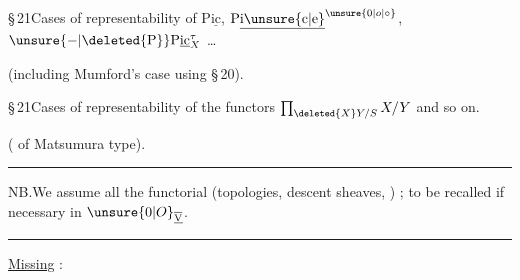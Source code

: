 \S\,21\quad Cases of representability of $\mathrm P\underline{\mathrm{ic}}$, $\mathrm P\underline{\mathrm i\unsure{\mathrm c|\mathrm e}}^{\unsure{0|o|\circ}}$, $\unsure{-|\deleted{\mathrm P}}\mathrm P\underline{\mathrm{ic}}_{X}^{\tau}$ \ldots

(including Mumford's case using \S\,20).

\S\,21\quad Cases of representability of the functors $\prod_{\deleted{X}Y/S}X/Y$ and so on.

( of Matsumura type).

\noindent\rule{\linewidth}{.3pt}

NB.\quad We assume  all the functorial  (topologies, descent sheaves, ) ; to be recalled if necessary in $\unsure{0|O}_{\underline{\overline{\mathrm V}}}$.

\noindent\rule{\linewidth}{.3pt}

\uline{Missing} :


